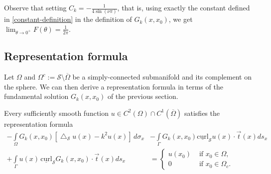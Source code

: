 \documentclass[final]{siamltex}
\newcommand{\lap}{\bigtriangleup}
\newcommand{\C}{C_k}
\renewcommand{\S} {\mathcal{S}}
\begin{document}
Observe that setting $\C=-\frac{1}{4\sin(\nu \pi)}$, that is, using exactly the constant defined in \eqref{constant-definition} in the definition of
$G_k(x,x_0)$, we  get $\lim_{\theta\rightarrow 0^+}F(\theta)=\frac{1}{2\pi}.$




\subsection{Representation formula}
\label{s:representation}
Let $\Omega$ and $\Omega^{c}:=\S\setminus{\overline{\Omega}}$ be a
simply-connected submanifold and its complement on the sphere. We can
then derive a representation formula in terms of the fundamental
solution
$G_k(x,x_{0})$ of the previous section.
\begin{proposition}
\label{prop:repr}
Every sufficiently smooth function $u \in C^{2}(\Omega) \cap
C^{1}(\overline{\Omega})$ satisfies the representation formula
\begin{align} 
\label{eq:representationformula}
 - \int\limits_{\Omega} 
    G_k(x,x_{0})\left[\lap_{\S}u(x) -k^2 u(x)\right]\,d\sigma_x 
 &- \int\limits_{{\Gamma}} G_k(x,x_{0})  
    \underline{\mbox{curl}}_{\S} u(x) \cdot \vec{t}(x) ds_x \nonumber \\
 + \int\limits_{{\Gamma}}  u(x)
 \,\underline{\mbox{curl}}_{{\S}} G_k(x,x_0) \cdot \vec{t}(x) ds_x 
 &= \left\{ \begin{array}{ll} u(x_0) & \mbox{ if $x_0\in \Omega$},\\
				0 & \mbox{ if  $x_0\in{\Omega}_c$}. 
  \end{array} \right.
\end{align}

\end{proposition}
\end{document}
